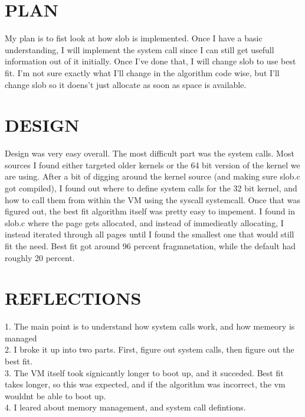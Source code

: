 \documentclass[letterpaper,10pt,titlepage]{article}
\begin{document}
\section{PLAN}
    My plan is to fist look at how slob is implemented. Once I have a basic understanding, I will implement the system call since I can still get usefull information out of it initially. Once I've done that, I will change slob to use best fit. I'm not sure exactly what I'll change in the algorithm code wise, but I'll change slob so it doens't just allocate as soon as space is available.   
 
\section{DESIGN}
    Design was very easy overall. The most difficult part was the system calls. Most sources I found either targeted older kernels or the 64 bit version of the kernel we are using. After a bit of digging around the kernel source (and making sure slob.c got compiled), I found out where to define system calls for the 32 bit kernel, and how to call them from within the VM using the syscall systemcall. Once that was figured out, the best fit algorithm itself was pretty easy to impement. I found in slob.c where the page gets allocated, and instead of immedieatly allocating, I instead iterated through all pages until I found the smallest one that would still fit the need. Best fit got around 96 percent fragmnetation, while the default had roughly 20 percent. 


\section{REFLECTIONS}
    1. The main point is to understand how system calls work, and how memeory is managed\\
    2. I broke it up into two parts. First, figure out system calls, then figure out the best fit. \\
    3. The VM itself took signicantly longer to boot up, and it succeded. Best fit takes longer, so this was expected, and if the algorithm was incorrect, the vm wouldnt be able to boot up.\\
    4. I leared about memory management, and system call defintions.\\ 


\end{document}
